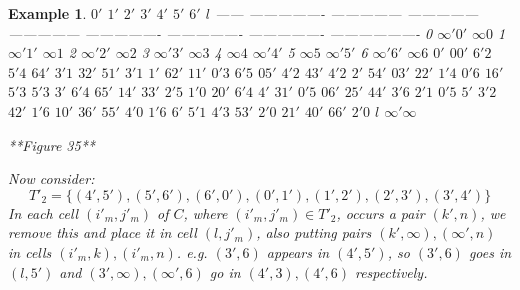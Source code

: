 \documentclass[
  11pt,
  a4paper]{book}
\newtheorem{example}{Example}
\begin{document}
\begin{example}
               $0'$            $1'$            $2'$            $3'$             $4'$             $5'$             $6'$               $l$
  ------ ---------------- --------------- --------------- --------------- ---------------- ---------------- ---------------- -------------------
    0                      $\infty ' 0'$                    $\infty 0$                                                       
    1                                      $\infty ' 1'$                     $\infty 1$                                      
    2                                                      $\infty ' 2'$                      $\infty 2$                     
    3                                                                      $\infty ' 3 '$                      $\infty 3$    
    4      $\infty  4 $                                                                     $\infty ' 4 '$                   
    5                      $\infty  5 $                                                                      $\infty ' 5 '$  
    6     $\infty ' 6 '$                    $\infty 6 $                                                                      
   $0'$       $00'$            $6'2$           $5'4$           $64'$           $3'1$            $32'$            $51'$              $3'1$
   $1'$       $62'$            $11'$           $0'3$           $6'5$           $05'$            $4'2$            $43'$              $4'2$
   $2'$       $54'$            $03'$           $22'$           $1'4$           $0'6$            $16'$            $5'3$              $5'3$
   $3'$       $6'4$            $65'$           $14'$           $33'$           $2'5$            $1'0$            $20'$              $6'4$
   $4'$       $31'$            $0'5$           $06'$           $25'$           $44'$            $3'6$            $2'1$              $0'5$
   $5'$       $3'2$            $42'$           $1'6$           $10'$           $36'$            $55'$            $4'0$              $1'6$
   $6'$       $5'1$            $4'3$           $53'$           $2'0$           $21'$            $40'$            $66'$              $2'0$
   $l$                                                                                                                        $\infty ' \infty$

**Figure 35**

Now consider:
$$T'_2 = \{(4',5'),(5',6'),(6',0'),(0',1'),(1',2'),(2',3'),(3',4')\}$$
In each cell $(i'_m,j'_m)$ of $C$, where
$(i'_m,j'_m) \in T'_2$, occurs a pair $(k',n)$,
we remove this and place it
in cell $(l,j'_m)$, also putting pairs
$(k',\infty),(\infty ',n)$ in cells $(i'_m,k),(i'_m,n)$.
e.g.
$(3',6)$ appears in $(4',5')$, so $(3',6)$ goes in $(l,5')$ and
$(3',\infty), (\infty ', 6)$ go in $(4',3),(4',6)$ respectively.


\end{example}
\end{document}
